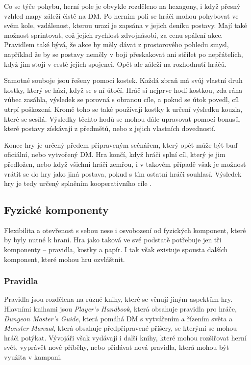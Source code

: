 Co se týče pohybu, herní pole je obvykle rozděleno na hexagony, i když přesný vzhled mapy záleží čistě na DM. Po herním poli se hráči mohou pohybovat ve svém kole, vzdálenost, kterou urazí je zapsána v jejich deníku postavy. Mají také možnost sprintovat, což jejich rychlost zdvojnásobí, za cenu spálení akce. Pravidlem také bývá, že akce by měly dávat z prostorového pohledu smysl, například že by se postavy neměly v boji přeskakovat ani střílet po nepřátelích, když jim stojí v cestě jejich spojenci. Opět ale záleží na rozhodnutí hráčů.

Samotné souboje jsou řešeny pomocí kostek. Každá zbraň má svůj vlastní druh kostky, který se hází, když se s ní útočí. Hráč si nejprve hodí kostkou, zda rána vůbec zasáhla, výsledek se porovná s obranou cíle, a pokud se útok povedl, cíl utrpí poškození. Kromě toho se také používají kostky k určení výsledku kouzla, které se sesílá. Výsledky těchto hodů se mohou dále upravovat pomocí bonusů, které postavy získávají z předmětů, nebo z jejich vlastních dovedností.

Konec hry je určený předem připraveným scénářem, který opět může být buď oficiální, nebo vytvořený DM. Hra končí, když hráči splní cíl, který je jim předložen, nebo když všichni hráči zemřou, i v takovém případě však je možnost vrátit se do hry jako jiná postava, pokud s tím ostatní hráči souhlasí. Výsledek hry je tedy určený splněním kooperativního cíle .

\subsection{Fyzické komponenty}
\label{subsec:dnd_components}

Flexibilita a otevřenost \dnd{} s sebou nese i osvobození od fyzických komponent, které by byly nutné k hraní. Hra jako taková ve své podstatě potřebuje jen tři komponenty -- pravidla, kostky a papír. I tak však existuje spousta dalších komponent, které mohou hru ozvláštnit.

\subsubsection*{Pravidla}
\label{subsubsec:dnd_comp_rules}

Pravidla \dnd{} jsou rozdělena na různé knihy, které se věnují jiným aspektům hry. Hlavními knihami jsou \textit{Player's Handbook}, která obsahuje pravidla pro hráče, \textit{Dungeon Master's Guide}, která pomáhá DM s vytvářením a řízením světa a \textit{Monster Manual}, která obsahuje předpřipravené příšery, se kterými se mohou hráči potýkat. Vývojáři však vydávají i další knihy, které mohou rozšiřovat herní svět, vyprávět nové příběhy, nebo přidávat nová pravidla, která mohou být využita v kampani.

